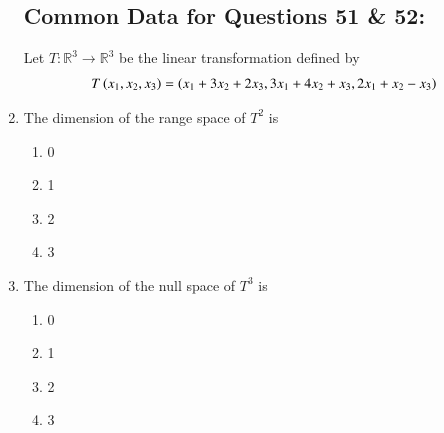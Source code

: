 \documentclass[journal]{IEEEtran}
\begin{document}
\begin{enumerate}
\subsection*{Common Data for Questions 51 \& 52:}
Let $T \colon \mathbb{R}^3 \rightarrow \mathbb{R}^3$ be the linear transformation defined by
\begin{align*}
    T\left(x_1, x_2, x_3\right) = \left(x_1 + 3 x_2+2x_3, 3x_1 + 4x_2 + x_3, 2x_1 + x_2 - x_3\right)
\end{align*}
\item The dimension of the range space of $T^2$ is
\begin{multicols}{2}
    \begin{enumerate}
        \item 0
        \item 1
        \item 2
        \item 3
    \end{enumerate}
\end{multicols}
\item The dimension of the null space of $T^3$ is
\begin{multicols}{2}
    \begin{enumerate}
        \item 0
        \item 1
        \item 2
        \item 3
    \end{enumerate}
\end{multicols}


\end{enumerate}
\end{document}
